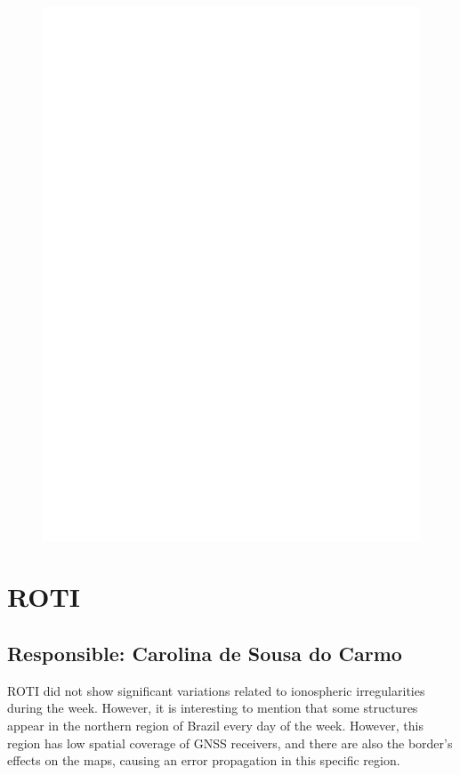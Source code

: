 \documentclass[11pt, oneside]{article}
\begin{document}
    
    \begin{figure}[H]
        \centering
        \includegraphics[width=14cm]{./figures/en_outfileScint_1.jpg}
    \end{figure} 
 

    \section{ROTI} 
 \subsection{Responsible: Carolina de Sousa do Carmo} 
 
ROTI did not show significant variations related to ionospheric irregularities during the week. However, it is interesting to mention that some structures appear in the northern region of Brazil every day of the week. However, this region has low spatial coverage of GNSS receivers, and there are also the border's effects on the maps, causing an error propagation in this specific region.
\end{document}
